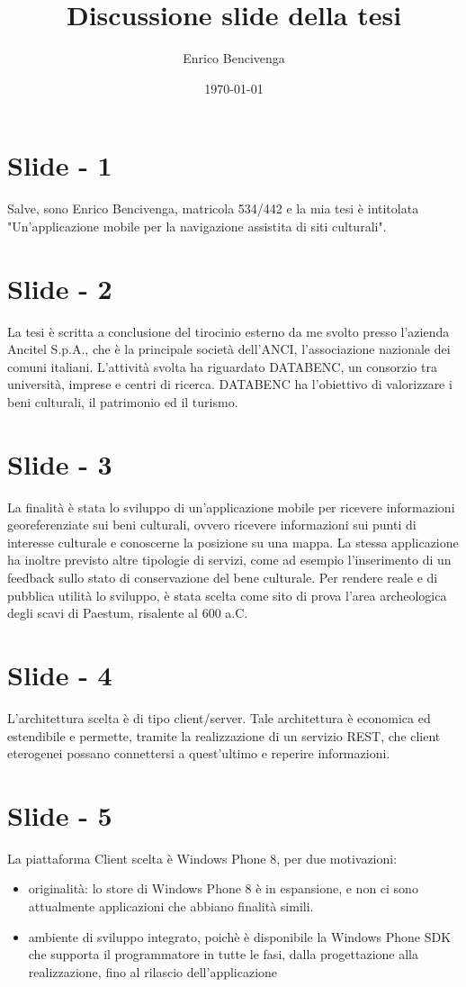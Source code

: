 \documentclass[12pt]{article}
\begin{document}
\title{Discussione slide della tesi}
\author{Enrico Bencivenga}
\date{\today}
\maketitle

\section{Slide - 1}
Salve, sono Enrico Bencivenga, matricola 534/442 e la mia tesi è intitolata "Un'applicazione mobile per la navigazione assistita di siti culturali".

\section{Slide - 2}
La tesi è scritta a conclusione del tirocinio esterno da me svolto presso l'azienda Ancitel S.p.A., che è la principale società dell'ANCI, l'associazione nazionale dei comuni italiani.
L'attività svolta ha riguardato DATABENC, un consorzio tra università, imprese e centri di ricerca.
DATABENC ha l'obiettivo di valorizzare i beni culturali, il patrimonio ed il turismo.
\section{Slide - 3}
La finalità è stata lo sviluppo di un'applicazione mobile per ricevere informazioni georeferenziate sui beni culturali, ovvero ricevere informazioni sui punti di interesse culturale e conoscerne la posizione su una mappa.
La stessa applicazione ha inoltre previsto altre tipologie di servizi, come ad esempio l'inserimento di un feedback sullo stato di conservazione del bene culturale.
Per rendere reale e di pubblica utilità lo sviluppo, è stata scelta come sito di prova l'area archeologica degli scavi di Paestum, risalente al 600 a.C.
\section{Slide - 4}
L'architettura scelta è di tipo client/server. Tale architettura è economica ed estendibile e permette, tramite la realizzazione di un servizio REST, che client eterogenei possano connettersi a quest'ultimo e reperire informazioni.
\section{Slide - 5}
La piattaforma Client scelta è Windows Phone 8, per due motivazioni:
\begin{itemize}
\item originalità: lo store di Windows Phone 8 è in espansione, e non ci sono attualmente applicazioni che abbiano finalità simili.
\item ambiente di sviluppo integrato, poichè è disponibile la Windows Phone SDK che supporta il programmatore in tutte le fasi, dalla progettazione alla realizzazione, fino al rilascio dell'applicazione
\end{itemize}
\end{document}
